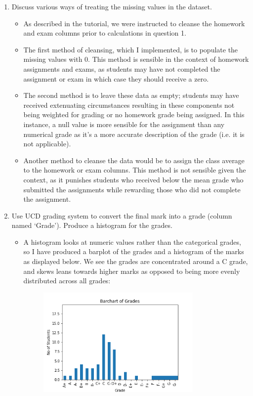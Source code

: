 \documentclass{scrreprt}
\begin{document}
\begin{enumerate}
\item Discuss various ways of treating the missing values in the dataset.
\begin{itemize}
	\item As described in the tutorial, we were instructed to cleanse the homework and exam columns prior to calculations in question 1. \item The first method of cleansing, which I implemented, is to populate the missing values with 0. This method is sensible in the context of homework assignments and exams, as students may have not completed the assignment or exam in which case they should receive a zero. 
	\item The second method is to leave these data as empty; students may have received extenuating circumstances resulting in these components not being weighted for grading or no homework grade being assigned. In this instance, a null value is more sensible for the assignment than any numerical grade as it's a more accurate description of the grade (i.e. it is not applicable). 
	\item Another method to cleanse the data would be to assign the class average to the homework or exam columns. This method is not sensible given the context, as it punishes students who received below the mean grade who submitted the assignments while rewarding those who did not complete the assignment.
\end{itemize}

\item Use UCD grading system to convert the final mark into a grade (column named ‘Grade’). Produce a histogram for the grades.
\begin{itemize}
\item A histogram looks at numeric values rather than the categorical grades, so I have produced a barplot of the grades and a histogram of the marks as displayed below. We see the grades are concentrated around a C grade, and skews leans towards higher marks as opposed to being more evenly distributed across all grades:

\begin{figure}[!h]
	\includegraphics[width=8cm]{barchart_of_grades_q1.png}
	\centering
\end{figure}


\end{itemize}
\end{enumerate}
\end{document}
